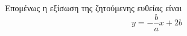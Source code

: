 \begin{solution}
\begin{myitemize}
      Επομένως η εξίσωση της ζητούμενης ευθείας είναι
      \[
        \boxed{y=-\frac{b}{a}x +2b}	
      \]
  \end{myitemize}
\end{solution}




